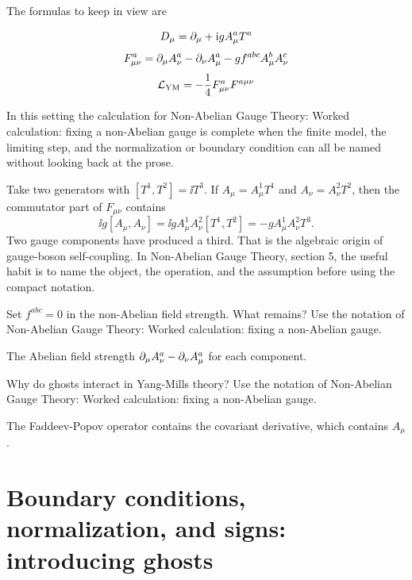 The formulas to keep in view are

\[
  D_\mu=\partial_\mu+\mathrm i gA_\mu^aT^a
\]
\[
  F_{\mu\nu}^a=\partial_\mu A_\nu^a-\partial_\nu A_\mu^a-gf^{abc}A_\mu^bA_\nu^c
\]
\[
  \mathcal L_{\mathrm{YM}}=-\frac14F_{\mu\nu}^aF^{a\mu\nu}
\]

In this setting the calculation for Non-Abelian Gauge Theory: Worked calculation: fixing a non-Abelian gauge is complete when the finite model, the limiting step, and the normalization or boundary condition can all be named without looking back at the prose.




\begin{example}
Take two generators with \([T^1,T^2]=\ii T^3\).  If \(A_\mu=A_\mu^1T^1\) and \(A_\nu=A_\nu^2T^2\), then the commutator part of \(F_{\mu\nu}\) contains
\[
  \ii g[A_\mu,A_\nu]=\ii gA_\mu^1A_\nu^2[T^1,T^2]=-gA_\mu^1A_\nu^2T^3.
\]
Two gauge components have produced a third.  That is the algebraic origin of gauge-boson self-coupling.  In Non-Abelian Gauge Theory, section 5, the useful habit is to name the object, the operation, and the assumption before using the compact notation.
\end{example}



\begin{exercise}
Set \(f^{abc}=0\) in the non-Abelian field strength.  What remains?  Use the notation of Non-Abelian Gauge Theory: Worked calculation: fixing a non-Abelian gauge.
\begin{answer}
The Abelian field strength \(\partial_\mu A_\nu^a-\partial_\nu A_\mu^a\) for each component.
\end{answer}
\end{exercise}

\begin{exercise}
Why do ghosts interact in Yang-Mills theory?  Use the notation of Non-Abelian Gauge Theory: Worked calculation: fixing a non-Abelian gauge.
\begin{answer}
The Faddeev-Popov operator contains the covariant derivative, which contains \(A_\mu\).
\end{answer}
\end{exercise}



\section{Boundary conditions, normalization, and signs: introducing ghosts}

